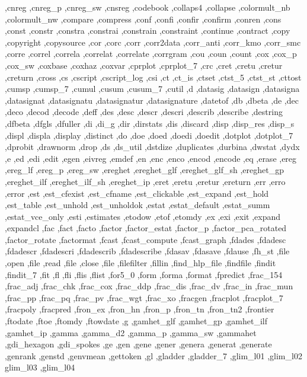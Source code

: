 {{    ,cnreg ,cnreg_p ,cnreg_sw ,cnsreg ,codebook ,collaps4 ,collapse
    ,colormult_nb ,colormult_nw ,compare ,compress ,conf ,confi
    ,confir ,confirm ,conren ,cons ,const ,constr ,constra ,constrai
    ,constrain ,constraint ,continue ,contract ,copy ,copyright
    ,copysource ,cor ,corc ,corr ,corr2data ,corr_anti ,corr_kmo
    ,corr_smc ,corre ,correl ,correla ,correlat ,correlate ,corrgram
    ,cou ,coun ,count ,cox ,cox_p ,cox_sw ,coxbase ,coxhaz ,coxvar
    ,cprplot ,cprplot_7 ,crc ,cret ,cretu ,cretur ,creturn ,cross ,cs
    ,cscript ,cscript_log ,csi ,ct ,ct_is ,ctset ,ctst_5 ,ctst_st
    ,cttost ,cumsp ,cumsp_7 ,cumul ,cusum ,cusum_7 ,cutil ,d ,datasig
    ,datasign ,datasigna ,datasignat ,datasignatu ,datasignatur
    ,datasignature ,datetof ,db ,dbeta ,de ,dec ,deco ,decod ,decode
    ,deff ,des ,desc ,descr ,descri ,describ ,describe ,destring
    ,dfbeta ,dfgls ,dfuller ,di ,di_g ,dir ,dirstats ,dis ,discard
    ,disp ,disp_res ,disp_s ,displ ,displa ,display ,distinct ,do
    ,doe ,doed ,doedi ,doedit ,dotplot ,dotplot_7 ,dprobit ,drawnorm
    ,drop ,ds ,ds_util ,dstdize ,duplicates ,durbina ,dwstat ,dydx ,e
    ,ed ,edi ,edit ,egen ,eivreg ,emdef ,en ,enc ,enco ,encod ,encode
    ,eq ,erase ,ereg ,ereg_lf ,ereg_p ,ereg_sw ,ereghet ,ereghet_glf
    ,ereghet_glf_sh ,ereghet_gp ,ereghet_ilf ,ereghet_ilf_sh ,ereghet_ip
    ,eret ,eretu ,eretur ,ereturn ,err ,erro ,error ,est ,est_cfexist
    ,est_cfname ,est_clickable ,est_expand ,est_hold ,est_table
    ,est_unhold ,est_unholdok ,estat ,estat_default ,estat_summ
    ,estat_vce_only ,esti ,estimates ,etodow ,etof ,etomdy ,ex ,exi
    ,exit ,expand ,expandcl ,fac ,fact ,facto ,factor ,factor_estat
    ,factor_p ,factor_pca_rotated ,factor_rotate ,factormat ,fcast
    ,fcast_compute ,fcast_graph ,fdades ,fdadesc ,fdadescr ,fdadescri
    ,fdadescrib ,fdadescribe ,fdasav ,fdasave ,fdause ,fh_st ,file
    ,open ,file ,read ,file ,close ,file ,filefilter ,fillin
    ,find_hlp_file ,findfile ,findit ,findit_7 ,fit ,fl ,fli ,flis
    ,flist ,for5_0 ,form ,forma ,format ,fpredict ,frac_154 ,frac_adj
    ,frac_chk ,frac_cox ,frac_ddp ,frac_dis ,frac_dv ,frac_in ,frac_mun
    ,frac_pp ,frac_pq ,frac_pv ,frac_wgt ,frac_xo ,fracgen ,fracplot
    ,fracplot_7 ,fracpoly ,fracpred ,fron_ex ,fron_hn ,fron_p ,fron_tn
    ,fron_tn2 ,frontier ,ftodate ,ftoe ,ftomdy ,ftowdate ,g ,gamhet_glf
    ,gamhet_gp ,gamhet_ilf ,gamhet_ip ,gamma ,gamma_d2 ,gamma_p
    ,gamma_sw ,gammahet ,gdi_hexagon ,gdi_spokes ,ge ,gen ,gene ,gener
    ,genera ,generat ,generate ,genrank ,genstd ,genvmean ,gettoken
    ,gl ,gladder ,gladder_7 ,glim_l01 ,glim_l02 glim_l03 ,glim_l04
}}
